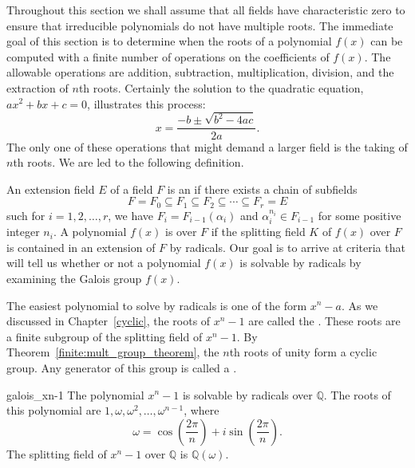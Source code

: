  
Throughout this section we shall assume that all fields have
characteristic zero to ensure that irreducible polynomials do not have
multiple roots. The immediate goal of this section is to determine when
the roots of a polynomial $f(x)$ can be computed with a finite number of
operations on the coefficients of $f(x)$. The allowable operations are
addition, subtraction, multiplication, division, and the extraction
of $n$th roots. Certainly the solution to the quadratic equation,
$a x^2 + b x +c=0$, illustrates this process:
\[
x = \frac{-b \pm \sqrt{b^2 - 4ac}}{2a}.
\]
The only one of these operations that might demand a larger field is
the taking of $n$th roots.  We are led to the following definition.
 
 
An extension field $E$ of a field $F$ is an 
 if there exists a chain of subfields
\[
F = F_0 \subseteq F_1 \subseteq F_2 \subseteq \cdots \subseteq F_r = E
\]
such for $i = 1, 2, \ldots, r$, we have  $F_i = F_{i - 1}(\alpha_i)$ and $\alpha_i^{n_i} \in F_{i-1}$ for some positive integer $n_i$.
A polynomial $f(x)$ is  over $F$ if the splitting
field $K$ of $f(x)$ over $F$ is contained in an extension of $F$ by
radicals. Our goal is to arrive at  
criteria that will tell us whether or not a polynomial $f(x)$ is
solvable by radicals by examining the Galois group $f(x)$.
 
 
The easiest polynomial to solve by radicals is one of the form $x^n -
a$. As we discussed in Chapter~\ref{cyclic}, the roots of $x^n - 1$ are called
the .  These
roots are a finite subgroup of the splitting field of $x^n -1$. By
Theorem~\ref{finite:mult_group_theorem}, the $n$th roots of unity form a cyclic group.  Any
generator of this group is called a . 


 
 

\begin{example}{galois_xn-1}
The polynomial $x^n - 1$ is solvable by radicals over ${\mathbb Q}$. The
roots of this polynomial are $1, \omega, \omega^2, \ldots,
\omega^{n-1}$, where
\[
\omega = \cos\left( \frac{2 \pi}{n} \right) + 
i \sin\left( \frac{2 \pi}{n} \right).
\]
The splitting field of $x^n - 1$ over ${\mathbb Q}$ is ${\mathbb Q}(\omega)$.
\end{example}
 
